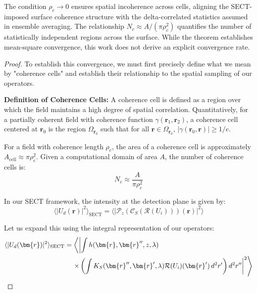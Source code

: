 \documentclass[a4paper,12pt]{article}
\begin{document}
The condition $\rho_c \to 0$ ensures spatial incoherence across cells, aligning the SECT-imposed surface coherence structure with the delta-correlated statistics assumed in ensemble averaging. The relationship $N_c \approx A / (\pi \rho_c^2)$ quantifies the number of statistically independent regions across the surface. While the theorem establishes mean-square convergence, this work does not derive an explicit convergence rate.

\begin{proof}
To establish this convergence, we must first precisely define what we mean by "coherence cells" and establish their relationship to the spatial sampling of our operators.

\textbf{Definition of Coherence Cells:} A coherence cell is defined as a region over which the field maintains a high degree of spatial correlation. Quantitatively, for a partially coherent field with coherence function $\gamma(\bm{r}_1, \bm{r}_2)$, a coherence cell centered at $\bm{r}_0$ is the region $\Omega_{\bm{r}_0}$ such that for all $\bm{r} \in \Omega_{\bm{r}_0}$, $|\gamma(\bm{r}_0, \bm{r})| \geq 1/e$.

For a field with coherence length $\rho_c$, the area of a coherence cell is approximately $A_{\text{cell}} \approx \pi\rho_c^2$. Given a computational domain of area $A$, the number of coherence cells is:
\begin{equation}
N_c \approx \frac{A}{\pi\rho_c^2}
\end{equation}

In our SECT framework, the intensity at the detection plane is given by:
\begin{equation}
\langle |U_d(\bm{r})|^2 \rangle_{\text{SECT}} = \langle |\mathcal{P}_z(\mathcal{C}_S(\mathcal{R}(U_i)))(\bm{r})|^2 \rangle
\end{equation}

Let us expand this using the integral representation of our operators:
\begin{align}
\langle |U_d(\bm{r})|^2 \rangle_{\text{SECT}} 
&= \left\langle \left| \int h(\bm{r}, \bm{r}'', z, \lambda) \right. \right. \\
&\quad \left. \left. \times \left( \int K_S(\bm{r}'', \bm{r}', \lambda) \notag
\mathcal{R}(U_i)(\bm{r}') \, d^2r' \right) d^2r'' \right|^2 \right\rangle
\end{align}


\end{proof}
\end{document}
